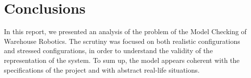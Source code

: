 \section{Conclusions}
In this report, we presented an analysis of the problem of the Model Checking of Warehouse Robotics. The scrutiny was focused on both realistic configurations and stressed configurations, in order to understand the validity of the representation of the system. To sum up, the model appears coherent with the specifications of the project and with abstract real-life situations.